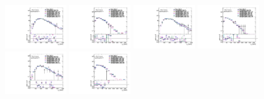\begin{figure}[htbp!]
\begin{center}
\includegraphics[angle=270, width=0.24\textwidth]{./figures/boosted/AppendixReweight/Compare/Data_FourTag_Sideband_directcompare_leadHCand_trk0_Pt_1.pdf}
\includegraphics[angle=270, width=0.24\textwidth]{./figures/boosted/AppendixReweight/Compare/Data_FourTag_Sideband_directcompare_leadHCand_trk1_Pt_1.pdf}
\includegraphics[angle=270, width=0.24\textwidth]{./figures/boosted/AppendixReweight/Compare/Data_FourTag_Sideband_directcompare_sublHCand_trk0_Pt_1.pdf}
\includegraphics[angle=270, width=0.24\textwidth]{./figures/boosted/AppendixReweight/Compare/Data_FourTag_Sideband_directcompare_sublHCand_trk1_Pt_1.pdf}\\
\includegraphics[angle=270, width=0.24\textwidth]{./figures/boosted/AppendixReweight/Compare/Data_FourTag_Control_directcompare_leadHCand_trk0_Pt_1.pdf}
\includegraphics[angle=270, width=0.24\textwidth]{./figures/boosted/AppendixReweight/Compare/Data_FourTag_Control_directcompare_leadHCand_trk1_Pt_1.pdf}

\end{center}
\end{figure}
